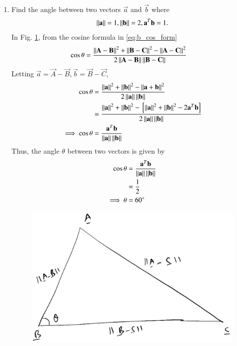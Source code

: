 \begin{enumerate}[label=\arabic*.,ref=\thesubsection.\theenumi]
%
%
\item Find the angle between two vectors $\vec{a}$ and $\vec{b}$ where 
%
\begin{align}
\left\lVert\mathbf{a}\right\rVert = 1,
\left\lVert\mathbf{b}\right\rVert = 2,
\mathbf{a}^T\mathbf{b} = 1.
\end{align}
%
\solution In Fig. \ref{fig:line_scalar_prod}, from the cosine formula in \eqref{eq:b_cos_form}
%
\begin{align}
\cos \theta &= \frac{\left\lVert\mathbf{A}-\mathbf{B}\right\rVert^2+\left\lVert\mathbf{B}-\mathbf{C}\right\rVert^2-\left\lVert\mathbf{A}-\mathbf{C}\right\rVert^2}{2\left\lVert\mathbf{A}-\mathbf{B}\right\rVert\left\lVert\mathbf{B}-\mathbf{C}\right\rVert}
\end{align}
Letting $\vec{a} = \vec{A}-\vec{B}, \vec{b} = \vec{B}-\vec{C}$, 
\begin{align}
\cos \theta &= \frac{\left\lVert\mathbf{a}\right\rVert^2+\left\lVert\mathbf{b}\right\rVert^2-\left\lVert\mathbf{a}+\mathbf{b}\right\rVert^2}{2\left\lVert\mathbf{a}\right\rVert\left\lVert\mathbf{b}\right\rVert}
\\
&= \frac{\left\lVert\mathbf{a}\right\rVert^2+\left\lVert\mathbf{b}\right\rVert^2-{}\left[\left\lVert\mathbf{a}\right\rVert^2+\left\lVert\mathbf{b}\right\rVert^2-2\mathbf{a}^T\mathbf{b}\right]}{2\left\lVert\mathbf{a}\right\rVert\left\lVert\mathbf{b}\right\rVert}
\\
\implies \cos \theta &=\frac{\mathbf{a}^T\mathbf{b}}{\left\lVert\mathbf{a}\right\rVert\left\lVert\mathbf{b}\right\rVert}
\end{align}
%
Thus, the angle $\theta$ between two vectors is given by 
%
\begin{align}
\label{eq:line_scalar_prod}
\cos \theta &= \frac{\mathbf{a}^T\mathbf{b}}{\left\lVert\mathbf{a}\right\rVert\left\lVert\mathbf{b}\right\rVert}
\\
&=\frac{1}{2}
\\
\implies \theta &= 60\degree
\end{align}
%
\begin{figure}[!ht]
\includegraphics[width=\columnwidth]{./line/figs/line_scalar_prod.eps}
\caption{}
\label{fig:line_scalar_prod}
\end{figure}
%



\end{enumerate}
